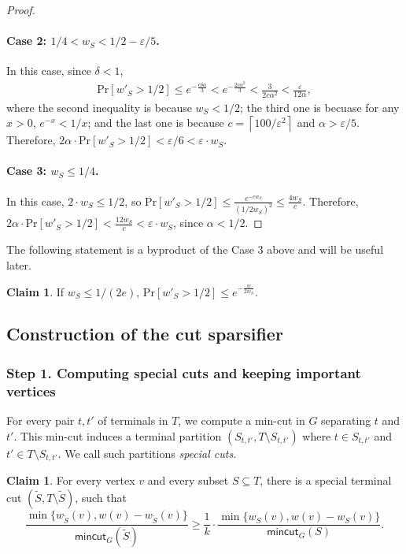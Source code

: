 \documentclass[11pt]{article}
\theoremstyle{definition}
\newtheorem{claim}[theorem]{Claim}
\newcommand{\eps}{{\varepsilon}}
\def\ceil#1{\left\lceil #1 \right\rceil}
\def\pr#1{\mathrm{Pr}\left[ #1 \right]}
\newcommand{\mc}{\mathsf{mincut}}
\begin{document}
\begin{proof}
\paragraph{Case 2: $1/4 < w_S < 1/2 - \eps/5$.} In this case, since $\delta < 1$,
\begin{align*}
	\pr{w'_S > 1/2} \le e^{-\frac{c \delta \alpha}{3}} < e^{- \frac{2 c \alpha^2}{3}} < \frac{3}{2 c \alpha^2} < \frac{\eps}{12\alpha},
	\end{align*}
where the second inequality is because $w_S < 1/2$; the third one is becuase for any $x>0$, $e^{-x}<1/x$; and the last one is because $c=\ceil{100/\eps^2}$ and $\alpha>\eps/5$. Therefore, $2\alpha \cdot \pr{w'_S > 1/2} < \eps/6 < \eps\cdot w_S$. 
\paragraph{Case 3: $w_S \le 1/4$.} In this case, $2\cdot w_S \le 1/2$, so $\pr{w'_S > 1/2} \le \frac{e^{-c w_S}}{(1/2w_S)^2} \le \frac{4w_S}{c}$. Therefore, $2\alpha \cdot \pr{w'_S > 1/2} < \frac{12 w_S}{c} < \eps\cdot w_S$, since $\alpha < 1/2$.
\end{proof}

The following statement is a byproduct of the Case 3 above and will be useful later.
\begin{claim} \label{prop:v2}
	If $w_S \le 1/(2e)$, $\pr{w'_S > 1/2} \le e^{-\frac{w}{2w_S}}$.
\end{claim}

\subsection{Construction of the cut sparsifier}

\subsubsection*{Step 1. Computing special cuts and keeping important vertices}

For every pair $t,t'$ of terminals in $T$, we compute a min-cut in $G$ separating $t$ and $t'$. This min-cut induces a terminal partition $(S_{t,t'},T\setminus S_{t,t'})$ where $t\in S_{t,t'}$ and $t'\in T\setminus S_{t,t'}$. We call such partitions \emph{special cuts}.

\begin{claim} \label{lem:contribution}
For every vertex $v$ and every subset $S\subseteq T$, there is a special terminal cut $(\tilde S,T\setminus \tilde S)$, such that 
$$\frac{\min \{w_{\tilde S}(v),w(v)-w_{\tilde S}(v)\}}{\mc_G(\tilde S)} \ge \frac{1}{k}\cdot \frac{\min \{w_S(v),w(v)-w_S(v)\}}{\mc_G(S)}.$$
\end{claim}
\end{document}
